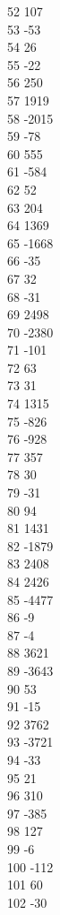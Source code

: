{ 52	107 \\
 53	-53 \\
 54	26 \\
 55	-22 \\
 56	250 \\
 57	1919 \\
 58	-2015 \\
 59	-78 \\
 60	555 \\
 61	-584 \\
 62	52 \\
 63	204 \\
 64	1369 \\
 65	-1668 \\
 66	-35 \\
 67	32 \\
 68	-31 \\
 69	2498 \\
 70	-2380 \\
 71	-101 \\
 72	63 \\
 73	31 \\
 74	1315 \\
 75	-826 \\
 76	-928 \\
 77	357 \\
 78	30 \\
 79	-31 \\
 80	94 \\
 81	1431 \\
 82	-1879 \\
 83	2408 \\
 84	2426 \\
 85	-4477 \\
 86	-9 \\
 87	-4 \\
 88	3621 \\
 89	-3643 \\
 90	53 \\
 91	-15 \\
 92	3762 \\
 93	-3721 \\
 94	-33 \\
 95	21 \\
 96	310 \\
 97	-385 \\
 98	127 \\
 99	-6 \\
 100	-112 \\
 101	60 \\
 102	-30 \\
}
